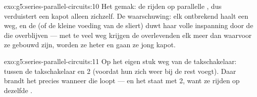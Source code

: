 \begin{solution}{exo:g5:series-parallel-circuits:10}
Het gemak: de  rijden op parallelle , dus verduistert
een kapot  alleen zichzelf. De waarschuwing: elk ontbrekend
 haalt een  weg, en de  (of de kleine voeding
van de sliert) duwt haar volle inspanning door de  die
overblijven --- met te veel weg krijgen de overlevenden elk meer dan
waarvoor ze gebouwd zijn, worden ze heter en gaan ze jong kapot.
\end{solution}

\begin{solution}{exo:g5:series-parallel-circuits:11}
Op het eigen stuk weg van de takschakelaar: tussen de
takschakelaar en  2 (voordat hun  zich weer bij de rest
voegt). Daar brandt het precies wanneer die  loopt --- en het
staat  met  2, want ze rijden op dezelfde
.
\end{solution}
